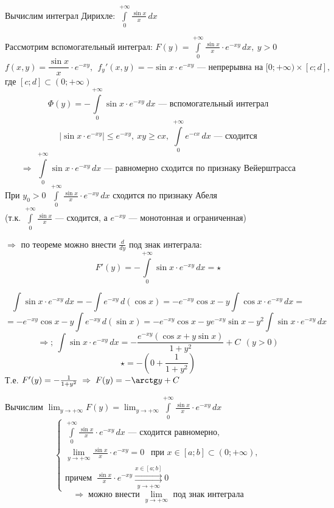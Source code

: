 \begin{example}
    Вычислим интеграл Дирихле: $\int\limits_0^{+\infty} \frac{\sin x}x\,dx$
    
    Рассмотрим вспомогательный интеграл: $F(y) = \int\limits_0^{+\infty} \frac{\sin x}x \cdot e^{-xy}\,dx, \ y > 0$
    \[ f(x, y) = \frac{\sin x}x \cdot e^{-xy}, \ \ f_y'(x, y) = -\sin x \cdot e^{-xy} 
    \text{ --- непрерывна на } [0; +\infty) \times [c; d], \]
    где $[c; d] \subset (0; +\infty)$
    \[ \Phi(y) = -\int\limits_0^{+\infty} \sin x \cdot e^{-xy}\,dx \text{ --- вспомогательный интеграл} \]
    \[ \left| \sin x \cdot e^{-xy} \right| \le e^{-xy}, \ xy \ge cx, \ \int\limits_0^{+\infty} e^{-cx}\,dx \text{ --- сходится} \]
    \[ \Rightarrow\; \int\limits_0^{+\infty} \sin x \cdot e^{-xy}\,dx \text{ --- равномерно сходится по признаку Вейерштрасса} \]
    При $y_0 > 0 \ \ \int\limits_0^{+\infty} \frac{\sin x}x \cdot e^{-xy}\,dx$ сходится по признаку Абеля \\
    (т.к. $\int\limits_0^{+\infty} \frac{\sin x}x$ --- сходится, а $e^{-xy}$ --- монотонная и ограниченная)
    
    $\Rightarrow$ по теореме можно внести $\frac{d}{dy}$ под знак интеграла:
    \[ F'(y) = -\int\limits_0^{+\infty} \sin x \cdot e^{-xy}\,dx = \star \]
    
    \[ \int \sin x \cdot e^{-xy}\,dx = -\int e^{-xy}\,d(\cos x) = -e^{-xy} \cos x - y \int \cos x \cdot e^{-xy}\,dx = \]
    \[ = -e^{-xy} \cos x - y \int e^{-xy}\,d(\sin x) = -e^{-xy} \cos x - y e^{-xy} \sin x - y^2 \int \sin x \cdot e^{-xy}\,dx \]
    \[ \Rightarrow;\ \int \sin x \cdot e^{-xy}\,dx = -\frac{e^{-xy} (\cos x + y \sin x)}{1 + y^2} + C \ \ (y > 0) \]
    \[ \star = -\left( 0 + \frac1{1 + y^2} \right) \]
    Т.е. $F'(y) = -\frac1{1 + y^2} \;\Rightarrow\; F(y) = -\arctg y + C$
    
    Вычислим $\lim_{y \to +\infty} F(y) = \lim_{y \to +\infty} \int\limits_0^{+\infty} \frac{\sin x}x \cdot e^{-xy}\,dx$
    \[ \left\{\begin{array}{l} 
    \int\limits_0^{+\infty} \frac{\sin x}x \cdot e^{-xy}\,dx \text{ --- сходится равномерно}, \\
    \lim_{y \to +\infty} \frac{\sin x}x \cdot e^{-xy} = 0 \ \ \text{ при } x \in [a; b] \subset (0; +\infty), \\
    \text{причем } \ \frac{\sin x}x \cdot e^{-xy} \overset{x \in [a; b]}{\underset{y \to +\infty}{\rightrightarrows}} 0
    \end{array}\right. \]
    \[ \Rightarrow\; \text{можно внести } \lim_{y \to +\infty} \text{ под знак интеграла} \]
    

\end{example}
